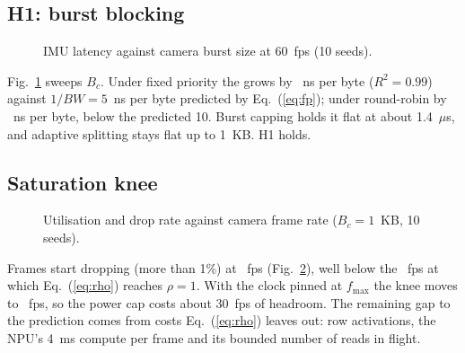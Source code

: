 \documentclass[conference]{IEEEtran}
\begin{document}
\subsection{H1: burst blocking}
\begin{figure}[t]\centering\caption{IMU \pone{} latency against camera burst size at 60~fps (10 seeds).}\label{fig:burst}\end{figure}
Fig.~\ref{fig:burst} sweeps $B_c$. Under fixed priority the \pone{} grows by \hOneFpSlope{}~ns per byte ($R^2=0.99$) against $1/BW=5$~ns per byte predicted by Eq.~(\ref{eq:fp}); under round-robin by \hOneRrSlope{}~ns per byte, below the predicted 10. Burst capping holds it flat at about 1.4~$\mu$s, and adaptive splitting stays flat up to 1~KB. H1 holds.

\subsection{Saturation knee}
\begin{figure}[t]\centering\caption{Utilisation and drop rate against camera frame rate ($B_c=1$~KB, 10 seeds).}\label{fig:knee}\end{figure}
Frames start dropping (more than 1\%) at \kneeFps{}~fps (Fig.~\ref{fig:knee}), well below the \kneePredFps{}~fps at which Eq.~(\ref{eq:rho}) reaches $\rho=1$. With the clock pinned at $f_{\max}$ the knee moves to \kneePinnedFps{}~fps, so the power cap costs about 30~fps of headroom. The remaining gap to the prediction comes from costs Eq.~(\ref{eq:rho}) leaves out: row activations, the NPU's 4~ms compute per frame and its bounded number of reads in flight.
\end{document}
